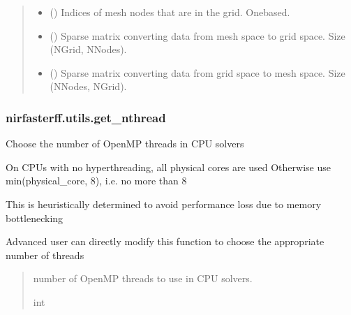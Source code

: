 \documentclass[letterpaper,10pt,english]{sphinxmanual}
\begin{document}
\begin{fulllineitems}
\begin{quote}
\begin{description}
\begin{itemize}
\item {} 
\sphinxAtStartPar
{} () \textendash{} Indices of mesh nodes that are in the grid. One\sphinxhyphen{}based.

\item {} 
\sphinxAtStartPar
{} () \textendash{} Sparse matrix converting data from mesh space to grid space. Size (NGrid, NNodes).

\item {} 
\sphinxAtStartPar
{} () \textendash{} Sparse matrix converting data from grid space to mesh space. Size (NNodes, NGrid).

\end{itemize}


\end{description}\end{quote}

\end{fulllineitems}


\sphinxstepscope


\subsubsection{nirfasterff.utils.get\_nthread}
\label{\detokenize{_autosummary/nirfasterff.utils.get_nthread:nirfasterff-utils-get-nthread}}\label{\detokenize{_autosummary/nirfasterff.utils.get_nthread::doc}}

\begin{fulllineitems}
\label{\detokenize{_autosummary/nirfasterff.utils.get_nthread:nirfasterff.utils.get_nthread}}
\pysigstartsignatures
\pysiglinewithargsret
{}
{}
{}
\pysigstopsignatures
\sphinxAtStartPar
Choose the number of OpenMP threads in CPU solvers

\sphinxAtStartPar
On CPUs with no hyperthreading, all physical cores are used
Otherwise use min(physical\_core, 8), i.e. no more than 8

\sphinxAtStartPar
This is heuristically determined to avoid performance loss due to memory bottlenecking

\sphinxAtStartPar
Advanced user can directly modify this function to choose the appropriate number of threads
\begin{quote}\begin{description}
\sphinxAtStartPar
{} \textendash{} number of OpenMP threads to use in CPU solvers.

\sphinxAtStartPar
int

\end{description}\end{quote}

\end{fulllineitems}
\end{document}

